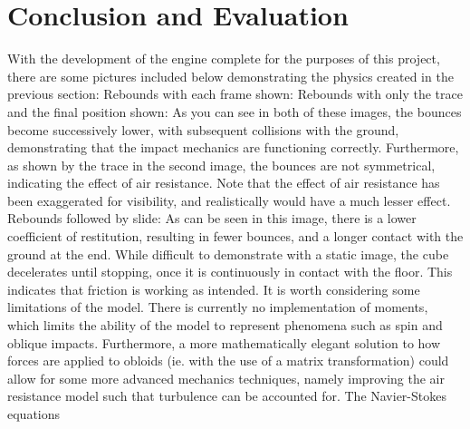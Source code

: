 \documentclass{article}
\begin{document}
\section{Conclusion and Evaluation}
With the development of the engine complete for the purposes of this project, there are some pictures included below demonstrating the physics created in the previous section:
\newline
\newline
\newline
Rebounds with each frame shown:
\newline
\newline
\newline
\newline
Rebounds with only the trace and the final position shown:
\newline
\newline
As you can see in both of these images, the bounces become successively lower, with subsequent collisions with the ground, demonstrating that the impact mechanics are functioning correctly.
\newline
\newline
Furthermore, as shown by the trace in the second image, the bounces are not symmetrical, indicating the effect of air resistance. Note that the effect of air resistance has been exaggerated for visibility, and realistically would have a much lesser effect.
\newpage
Rebounds followed by slide:
\newline
\newline
\newline
As can be seen in this image, there is a lower coefficient of restitution, resulting in fewer bounces, and a longer contact with the ground at the end. While difficult to demonstrate with a static image, the cube decelerates until stopping, once it is continuously in contact with the floor. This indicates that friction is working as intended.
\newline
\newline
\newline
It is worth considering some limitations of the model. There is currently no implementation of moments, which limits the ability of the model to represent phenomena such as spin and oblique impacts. Furthermore, a more mathematically elegant solution to how forces are applied to obloids (ie. with the use of a matrix transformation) could allow for some more advanced mechanics techniques, namely improving the air resistance model such that turbulence can be accounted for. The Navier-Stokes equations 
\end{document}
